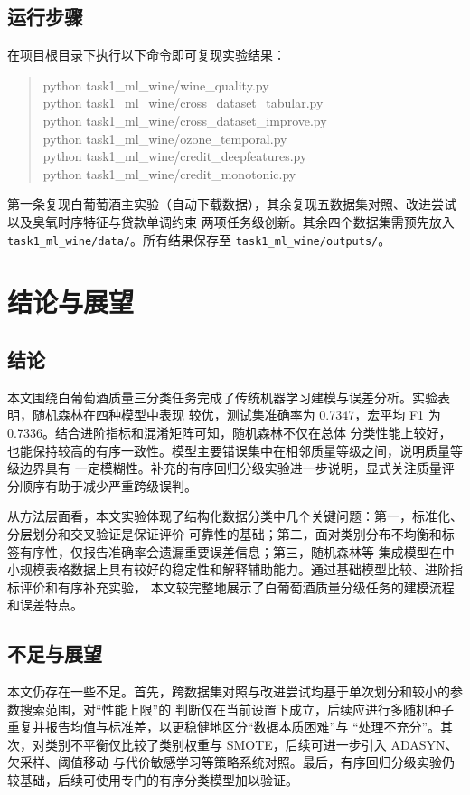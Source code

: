 \documentclass[12pt,a4paper,fontset=fandol]{ctexart}
\numberwithin{figure}{section}
\numberwithin{table}{section}
\numberwithin{equation}{section}
\begin{document}
\subsection{运行步骤}
在项目根目录下执行以下命令即可复现实验结果：
\begin{quote}
{\small\ttfamily python task1\_ml\_wine/wine\_quality.py\\
python task1\_ml\_wine/cross\_dataset\_tabular.py\\
python task1\_ml\_wine/cross\_dataset\_improve.py\\
python task1\_ml\_wine/ozone\_temporal.py\\
python task1\_ml\_wine/credit\_deepfeatures.py\\
python task1\_ml\_wine/credit\_monotonic.py}
\end{quote}
第一条复现白葡萄酒主实验（自动下载数据），其余复现五数据集对照、改进尝试以及臭氧时序特征与贷款单调约束
两项任务级创新。其余四个数据集需预先放入 \texttt{task1\_ml\_wine/data/}。所有结果保存至
\texttt{task1\_ml\_wine/outputs/}。

\section{结论与展望}

\subsection{结论}
本文围绕白葡萄酒质量三分类任务完成了传统机器学习建模与误差分析。实验表明，随机森林在四种模型中表现
较优，测试集准确率为 0.7347，宏平均 F1 为 0.7336。结合进阶指标和混淆矩阵可知，随机森林不仅在总体
分类性能上较好，也能保持较高的有序一致性。模型主要错误集中在相邻质量等级之间，说明质量等级边界具有
一定模糊性。补充的有序回归分级实验进一步说明，显式关注质量评分顺序有助于减少严重跨级误判。

从方法层面看，本文实验体现了结构化数据分类中几个关键问题：第一，标准化、分层划分和交叉验证是保证评价
可靠性的基础；第二，面对类别分布不均衡和标签有序性，仅报告准确率会遗漏重要误差信息；第三，随机森林等
集成模型在中小规模表格数据上具有较好的稳定性和解释辅助能力。通过基础模型比较、进阶指标评价和有序补充实验，
本文较完整地展示了白葡萄酒质量分级任务的建模流程和误差特点。

\subsection{不足与展望}
本文仍存在一些不足。首先，跨数据集对照与改进尝试均基于单次划分和较小的参数搜索范围，对“性能上限”的
判断仅在当前设置下成立，后续应进行多随机种子重复并报告均值与标准差，以更稳健地区分“数据本质困难”与
“处理不充分”。其次，对类别不平衡仅比较了类别权重与 SMOTE，后续可进一步引入 ADASYN、欠采样、阈值移动
与代价敏感学习等策略系统对照。最后，有序回归分级实验仍较基础，后续可使用专门的有序分类模型加以验证。
\end{document}
